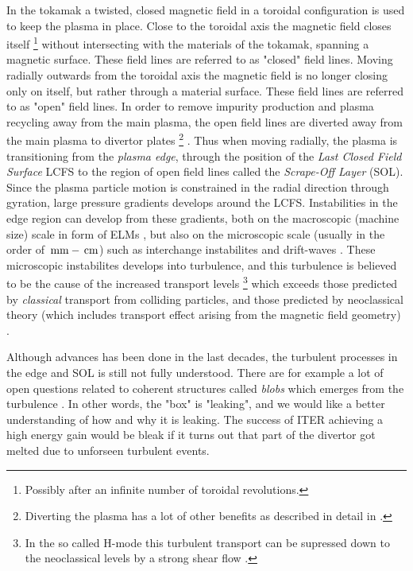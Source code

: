 In the tokamak a twisted, closed magnetic field in a toroidal configuration is used to keep the plasma in place.
Close to the toroidal axis the magnetic field closes itself
%
\footnote{Possibly after an infinite number of toroidal revolutions.}
%
without intersecting with the materials of the tokamak, spanning a magnetic surface.
These field lines are referred to as "closed" field lines.
Moving radially outwards from the toroidal axis the magnetic field is no longer closing only on itself, but rather through a material surface.
These field lines are referred to as "open" field lines.
In order to remove impurity production and plasma recycling away from the main plasma, the open field lines are diverted away from the main plasma to divertor plates%
%
\footnote{Diverting the plasma has a lot of other benefits as described in detail in \cite{Stangeby2000book,Stacey2012book}.}%
%
.
Thus when moving radially, the plasma is transitioning from the \emph{plasma edge}, through the position of the \emph{Last Closed Field Surface} LCFS to the region of open field lines called the \emph{Scrape-Off Layer} (SOL).
Since the plasma particle motion is constrained in the radial direction through gyration, large pressure gradients develops around the LCFS.
Instabilities in the edge region can develop from these gradients, both on the macroscopic (machine size) scale in form of ELMs \cite{Zohm1996}, but also on the microscopic scale (usually in the order of $\, \text{mm} - \, \text{cm}$) such as interchange instabilites \cite{Scott2005b} and drift-waves \cite{Tynan2009}.
These microscopic instabilites develops into turbulence, and this turbulence is believed to be the cause of the increased transport levels
%
\footnote{In the so called H-mode this turbulent transport can be supressed down to the neoclassical levels by a strong shear flow \cite{Burrell1997}.}%
%
which exceeds those predicted by \emph{classical} transport from colliding particles, and those predicted by neoclassical theory (which includes transport effect arising from the magnetic field geometry) \cite{Wootton1990}.

Although advances has been done in the last decades, the turbulent processes in the edge and SOL is still not fully understood.
There are for example a lot of open questions related to coherent structures called \emph{blobs} which emerges from the turbulence \cite{DIppolito2011}.
In other words, the "box" is "leaking", and we would like a better understanding of how and why it is leaking.
The success of ITER achieving a high energy gain would be bleak if it turns out that part of the divertor got melted due to unforseen turbulent events.


